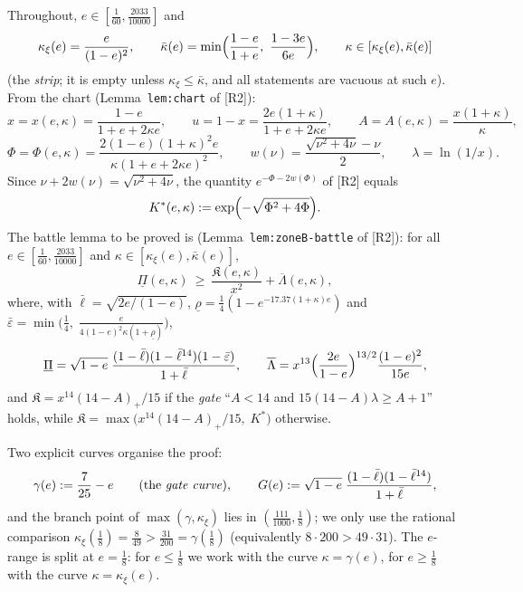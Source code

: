 \documentclass[11pt]{article}
\theoremstyle{remark}
\theoremstyle{plain}
\theoremstyle{plain}
\newcommand{\eps}{\varepsilon}
\newcommand{\Kfrak}{\mathfrak K}
\newcommand{\Kstar}{K^{*}}
\newcommand{\kxi}{\kappa_\xi}
\newcommand{\kbar}{\bar\kappa}
\newcommand{\lbar}{\bar\ell}
\newcommand{\epsbar}{\bar\eps}
\newcommand{\RII}{[R2]}
\begin{document}
Throughout, $e\in[\tfrac1{60},\tfrac{2033}{10000}]$ and
\[
        \kxi(e)=\frac e{(1-e)^2},\qquad
        \kbar(e)=\min\Bigl(\frac{1-e}{1+e},\ \frac{1-3e}{6e}\Bigr),\qquad
        \kappa\in[\kxi(e),\kbar(e)]
\]
(the \emph{strip}; it is empty unless $\kxi\le\kbar$, and all statements are
vacuous at such $e$).  From the chart (Lemma~\texttt{lem:chart} of \RII):
\[
        x=x(e,\kappa)=\frac{1-e}{1+e+2\kappa e},\qquad
        u=1-x=\frac{2e(1+\kappa)}{1+e+2\kappa e},\qquad
        A=A(e,\kappa)=\frac{x(1+\kappa)}\kappa ,
\]
\[
        \Phi=\Phi(e,\kappa)=\frac{2(1-e)(1+\kappa)^2e}{\kappa(1+e+2\kappa e)^2},
        \qquad
        w(\nu)=\frac{\sqrt{\nu^2+4\nu}-\nu}2 ,
        \qquad
        \lambda=\ln(1/x).
\]
Since $\nu+2w(\nu)=\sqrt{\nu^2+4\nu}$, the quantity
$e^{-\Phi-2w(\Phi)}$ of \RII{} equals
\begin{equation}\label{eq:Kstar-def}
        \Kstar(e,\kappa):=\exp\Bigl(-\sqrt{\Phi^2+4\Phi}\Bigr).
\end{equation}
The battle lemma to be proved is
(Lemma~\texttt{lem:zoneB-battle} of \RII):
for all $e\in[\tfrac1{60},\tfrac{2033}{10000}]$ and
$\kappa\in[\kxi(e),\kbar(e)]$,
\begin{equation}\label{eq:zb-battle}
        \underline\Pi(e,\kappa)\ \ge\
        \frac{\Kfrak(e,\kappa)}{x^2}+\overline\Lambda(e,\kappa),
\end{equation}
where, with $\lbar=\sqrt{2e/(1-e)}$,
$\underline\rho=\tfrac14(1-e^{-17.37(1+\kappa)e})$ and
$\epsbar=\min\bigl(\tfrac14,\;\frac e{4(1-e)^2\kappa(1+\underline\rho)}\bigr)$,
\[
        \underline\Pi
        =\sqrt{1-e}\;\frac{(1-\lbar)(1-\lbar^{14})(1-\epsbar)}{1+\lbar},
        \qquad
        \overline\Lambda
        =x^{13}\Bigl(\frac{2e}{1-e}\Bigr)^{13/2}\frac{(1-e)^2}{15e},
\]
and $\Kfrak=x^{14}(14-A)_+/15$ if the \emph{gate}
``$A<14$ and $15(14-A)\lambda\ge A+1$'' holds, while
$\Kfrak=\max\bigl(x^{14}(14-A)_+/15,\;\Kstar\bigr)$ otherwise.

Two explicit curves organise the proof:
\[
        \gamma(e):=\frac7{25}-e
        \qquad\text{(the \emph{gate curve})},
        \qquad
        G(e):=\sqrt{1-e}\;\frac{(1-\lbar)(1-\lbar^{14})}{1+\lbar},
\]
and the branch point of $\max(\gamma,\kxi)$ lies in
$(\tfrac{111}{1000},\tfrac18)$; we only use the rational comparison
$\kxi(\tfrac18)=\tfrac8{49}>\tfrac{31}{200}=\gamma(\tfrac18)$
(equivalently $8\cdot200>49\cdot31$).
The $e$-range is split at $e=\tfrac18$: for $e\le\tfrac18$ we work with the
curve $\kappa=\gamma(e)$, for $e\ge\tfrac18$ with the curve
$\kappa=\kxi(e)$.
\end{document}
